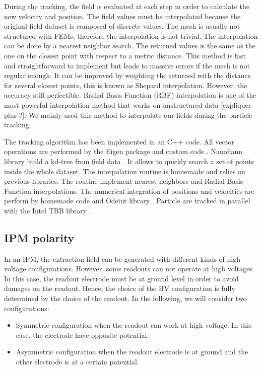 \begin{refsection}
  During the tracking, the field is evaluated at each step in order to calculate the new velocity and position. The field values must be interpolated because the original field dataset is composed of discrete values. The mesh is usually not structured with FEMs, therefore the interpolation is not trivial. The interpolation can be done by a nearest neighbor search. The returned values is the same as the one on the closest point with respect to a metric distance. This method is fast and straightforward to implement but leads to massive errors if the mesh is not regular enough. It can be improved by weighting the returned with the distance for several closest points, this is known as Shepard interpolation. However, the accuracy still perfectible. Radial Basis Function (RBF) interpolation is one of the most powerful interpolation method that works on unstructured data [expliquer plus ?]\cite{Wright2003}. We mainly used this method to interpolate our fields during the particle tracking. 

  

  The tracking algorithm has been implemented in an C++ code. All vector operations are performed by the Eigen package and custom code \cite{eigenweb}. Nanoflann library build a kd-tree from field data \cite{blanco2014nanoflann}. It allows to quickly search a set of points inside the whole dataset. The interpolation routine is homemade and relies on previous libraries. The routine implement nearest neighbors and Radial Basis Function interpolations. The numerical integration of positions and velocities are perform by homemade code and Odeint library \cite{Ahnert2011,Mulansky2014}. Particle are tracked in parallel with the Intel TBB library \cite{tbb2019}.
  
  \subsection{IPM polarity}

  In an IPM, the extraction field can be generated with different kinds of high voltage configurations. However, some readouts can not operate at high voltages. In this case, the readout electrode must be at ground level in order to avoid damages on the readout. Hence, the choice of the HV configuration is fully determined by the choice of the readout. In the following, we will consider two configurations:
  \begin{itemize}
    \item Symmetric configuration when the readout can work at high voltage. In this case, the electrode have opposite potential.
    \item Asymmetric configuration when the readout electrode is at ground and the other electrode is at a certain potential.
  \end{itemize}


\end{refsection}
